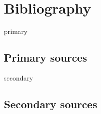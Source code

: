 
\chapter*{Bibliography}
\label{cha:bibliography}


\begin{btSect}[jox]{primary}
\section*{Primary sources}
\btPrintAll
\end{btSect}


\begin{btSect}[jox]{secondary}
\section*{Secondary sources}
\btPrintCited
\end{btSect}
